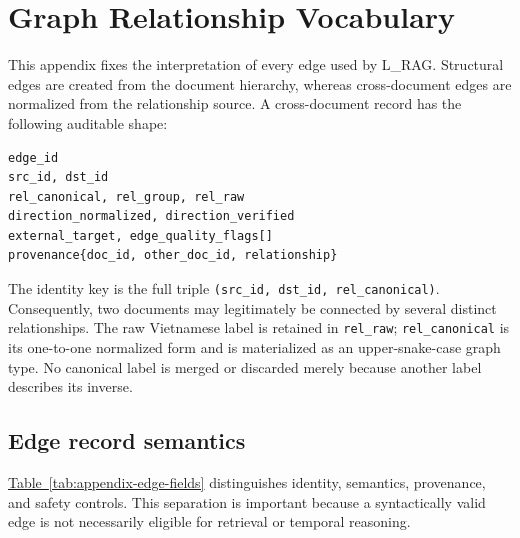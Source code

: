 \section{Graph Relationship Vocabulary}
\label{app:graph-vocabulary}

This appendix fixes the interpretation of every edge used by L\_RAG. Structural
edges are created from the document hierarchy, whereas cross-document edges are
normalized from the relationship source. A cross-document record has the
following auditable shape:

{\scriptsize
\begin{verbatim}
edge_id
src_id, dst_id
rel_canonical, rel_group, rel_raw
direction_normalized, direction_verified
external_target, edge_quality_flags[]
provenance{doc_id, other_doc_id, relationship}
\end{verbatim}
}

The identity key is the full triple
\texttt{(src\_id, dst\_id, rel\_canonical)}. Consequently, two documents may
legitimately be connected by several distinct relationships. The raw Vietnamese
label is retained in \texttt{rel\_raw}; \texttt{rel\_canonical} is its
one-to-one normalized form and is materialized as an upper-snake-case graph
type. No canonical label is merged or discarded merely because another label
describes its inverse.

\subsection{Edge record semantics}

\hyperref[tab:appendix-edge-fields]{Table~\ref*{tab:appendix-edge-fields}}
distinguishes identity, semantics, provenance, and safety controls. This
separation is important because a syntactically valid edge is not necessarily
eligible for retrieval or temporal reasoning.


